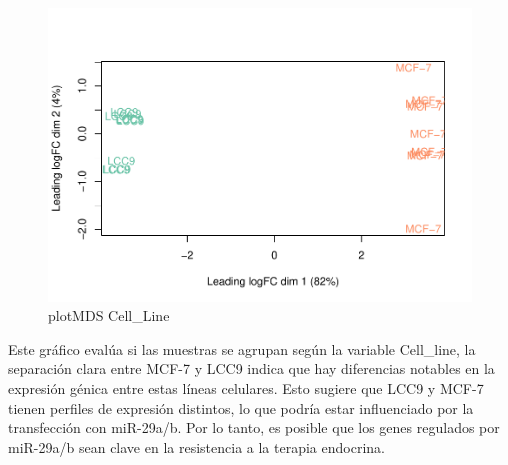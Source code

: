 \documentclass[
]{article}
\begin{document}
\begin{figure}
\centering
\includegraphics{Proyecto_RNAseq_files/figure-latex/unnamed-chunk-19-1.pdf}
\caption{plotMDS Cell\_Line}
\end{figure}

Este gráfico evalúa si las muestras se agrupan según la variable
Cell\_line, la separación clara entre MCF-7 y LCC9 indica que hay
diferencias notables en la expresión génica entre estas líneas
celulares. Esto sugiere que LCC9 y MCF-7 tienen perfiles de expresión
distintos, lo que podría estar influenciado por la transfección con
miR-29a/b. Por lo tanto, es posible que los genes regulados por
miR-29a/b sean clave en la resistencia a la terapia endocrina.
\end{document}
